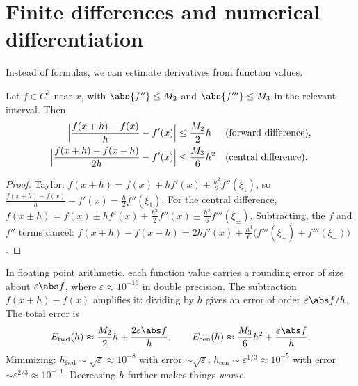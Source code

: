 \section{Finite differences and numerical differentiation}

Instead of formulas, we can estimate derivatives from function values.

\begin{theorem}\label{thm:fderror}
Let $f\in C^3$ near $x$, with $\abs{f''}\le M_2$ and $\abs{f'''}\le M_3$ in the relevant interval. Then
\begin{align*}
\Bigl|\frac{f(x+h)-f(x)}h-f'(x)\Bigr|&\le\frac{M_2}2h &&\text{(forward difference)},\\
\Bigl|\frac{f(x+h)-f(x-h)}{2h}-f'(x)\Bigr|&\le\frac{M_3}6h^2 &&\text{(central difference)}.
\end{align*}
\end{theorem}

\begin{proof}
Taylor: $f(x+h)=f(x)+hf'(x)+\frac{h^2}2f''(\xi_1)$, so $\frac{f(x+h)-f(x)}h-f'(x)=\frac h2f''(\xi_1)$. For the central difference, $f(x\pm h)=f(x)\pm hf'(x)+\frac{h^2}2f''(x)\pm\frac{h^3}6f'''(\xi_\pm)$. Subtracting, the $f$ and $f''$ terms cancel: $f(x+h)-f(x-h)=2hf'(x)+\frac{h^3}6\bigl(f'''(\xi_+)+f'''(\xi_-)\bigr)$.
\end{proof}

In floating point arithmetic, each function value carries a rounding error of size about $\varepsilon\abs f$, where $\varepsilon\approx10^{-16}$ in double precision. The subtraction $f(x+h)-f(x)$ amplifies it: dividing by $h$ gives an error of order $\varepsilon\abs f/h$. The total error is
\[
E_{\text{fwd}}(h)\approx\frac{M_2}2h+\frac{2\varepsilon\abs f}h,\qquad E_{\text{cen}}(h)\approx\frac{M_3}6h^2+\frac{\varepsilon\abs f}h .
\]
Minimizing: $h_{\text{fwd}}\sim\sqrt\varepsilon\approx10^{-8}$ with error $\sim\sqrt\varepsilon$; $h_{\text{cen}}\sim\varepsilon^{1/3}\approx10^{-5}$ with error $\sim\varepsilon^{2/3}\approx10^{-11}$. Decreasing $h$ further makes things \emph{worse}.


